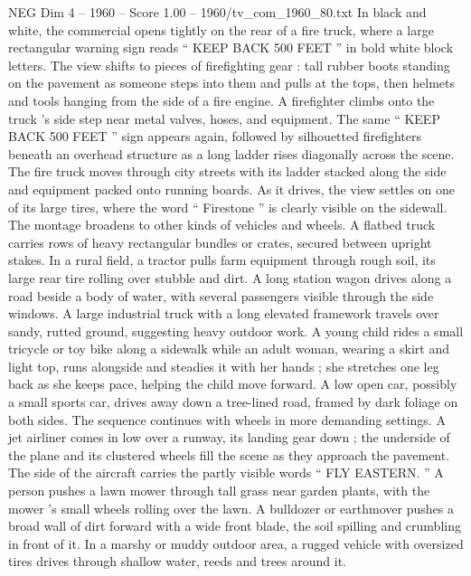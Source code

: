 \begin{textsample}{NEG Dim 4 – 1960 – Score 1.00 – 1960/tv\_com\_1960\_80.txt}  \label{ex:f4_neg_040}
In black and white, the commercial opens tightly on the rear of a fire truck, where a large rectangular warning sign reads “ KEEP BACK 500 FEET ” in bold white block letters.
The view shifts to pieces of firefighting gear : tall rubber boots standing on the pavement as someone steps into them and pulls at the tops, then helmets and tools hanging from the side of a fire engine.
A firefighter climbs onto the truck ’s side step near metal valves, hoses, and equipment.
The same “ KEEP BACK 500 FEET ” sign appears again, followed by silhouetted firefighters beneath an overhead structure as a long ladder rises diagonally across the scene.
The fire truck moves through city streets with its ladder stacked along the side and equipment packed onto running boards.
As it drives, the view settles on one of its large tires, where the word “ Firestone ” is clearly visible on the sidewall.
The montage broadens to other kinds of vehicles and wheels.
A flatbed truck carries rows of heavy rectangular bundles or crates, secured between upright stakes.
In a rural field, a tractor pulls farm equipment through rough soil, its large rear tire rolling over stubble and dirt.
A long station wagon drives along a road beside a body of water, with several passengers visible through the side windows.
A large industrial truck with a long elevated framework travels over sandy, rutted ground, suggesting heavy outdoor work.
A young child rides a small tricycle or toy bike along a sidewalk while an adult woman, wearing a skirt and light top, runs alongside and steadies it with her hands ; she stretches one leg back as she keeps pace, helping the child move forward.
A low open car, possibly a small sports car, drives away down a tree-lined road, framed by dark foliage on both sides.
The sequence continues with wheels in more demanding settings.
A jet airliner comes in low over a runway, its landing gear down ; the underside of the plane and its clustered wheels fill the scene as they approach the pavement.
The side of the aircraft carries the partly visible words “ FLY EASTERN. ” A person pushes a lawn mower through tall grass near garden plants, with the mower ’s small wheels rolling over the lawn.
A bulldozer or earthmover pushes a broad wall of dirt forward with a wide front blade, the soil spilling and crumbling in front of it.
In a marshy or muddy outdoor area, a rugged vehicle with oversized tires drives through shallow water, reeds and trees around it.

\end{textsample}
